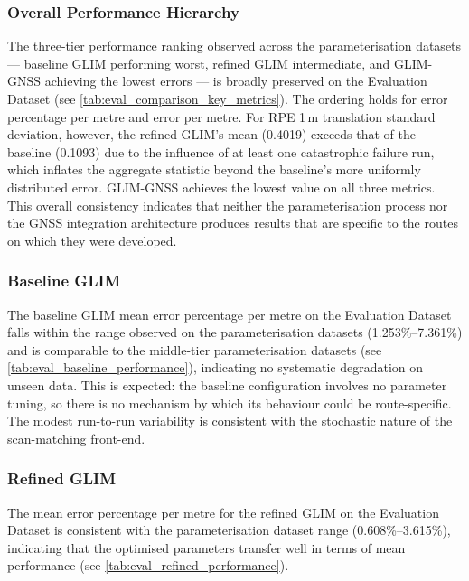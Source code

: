 \subsubsection{Overall Performance Hierarchy}

The three-tier performance ranking observed across the parameterisation datasets — baseline GLIM performing worst, refined GLIM intermediate, and GLIM-GNSS achieving the lowest errors — is broadly preserved on the Evaluation Dataset (see \cref{tab:eval_comparison_key_metrics}). The ordering holds for error percentage per metre and error per metre. For RPE 1\,m translation standard deviation, however, the refined GLIM's mean (0.4019) exceeds that of the baseline (0.1093) due to the influence of at least one catastrophic failure run, which inflates the aggregate statistic beyond the baseline's more uniformly distributed error. GLIM-GNSS achieves the lowest value on all three metrics. This overall consistency indicates that neither the parameterisation process nor the GNSS integration architecture produces results that are specific to the routes on which they were developed.

\subsubsection{Baseline GLIM}

The baseline GLIM mean error percentage per metre on the Evaluation Dataset falls within the range observed on the parameterisation datasets (1.253\%--7.361\%) and is comparable to the middle-tier parameterisation datasets (see \cref{tab:eval_baseline_performance}), indicating no systematic degradation on unseen data. This is expected: the baseline configuration involves no parameter tuning, so there is no mechanism by which its behaviour could be route-specific. The modest run-to-run variability is consistent with the stochastic nature of the scan-matching front-end.

\subsubsection{Refined GLIM}

The mean error percentage per metre for the refined GLIM on the Evaluation Dataset is consistent with the parameterisation dataset range (0.608\%--3.615\%), indicating that the optimised parameters transfer well in terms of mean performance (see \cref{tab:eval_refined_performance}).

